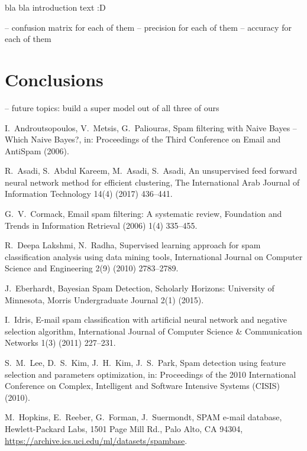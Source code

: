 \documentclass[11pt,a4paper]{article}
\begin{document}
bla bla introduction text :D


-- confusion matrix for each of them
-- precision for each of them
-- accuracy for each of them

\section{Conclusions}

-- future topics: build a super model out of all three of ours


\begin{thebibliography}{99}
\begin{small}
  I.\ Androutsopoulos, V.\ Metsis, G.\ Paliouras,
  Spam filtering with Naive Bayes -- Which Naive Bayes?,
  in: Proceedings of the Third Conference on Email and AntiSpam (2006).

  R.\ Asadi, S.\ Abdul Kareem, M.\ Asadi, S.\ Asadi, 
  An unsupervised feed forward neural network method for efficient clustering,
  The International Arab Journal of Information Technology 14(4) (2017) 436--441.

  G.\ V.\ Cormack, 
  Email spam filtering: A systematic review,
  Foundation and Trends in Information Retrieval (2006) 1(4) 335--455.

  R.\ Deepa Lakshmi, N.\ Radha, 
  Supervised learning approach for spam classification analysis using data mining tools,
  International Journal on Computer Science and Engineering 2(9) (2010) 2783--2789.

  J.\ Eberhardt, 
  Bayesian Spam Detection,
  Scholarly Horizons: University of Minnesota, Morris Undergraduate Journal  2(1) (2015).

  I.\ Idris, 
  E-mail spam classification with artificial neural network and negative selection algorithm,
  International Journal of Computer Science \& Communication Networks 1(3) (2011) 227--231.

  S.\ M.\ Lee, D.\ S.\ Kim, J.\ H.\ Kim, J.\ S.\ Park, 
  Spam detection using feature selection and parameters optimization,
  in: Proceedings of the 2010 International Conference on Complex, Intelligent and Software Intensive Systems (CISIS) (2010).

  M.\ Hopkins, E.\ Reeber, G.\ Forman, J.\ Suermondt, 
  SPAM e-mail database,
  Hewlett-Packard Labs, 1501 Page Mill Rd., Palo Alto, CA 94304,
  \url{https://archive.ics.uci.edu/ml/datasets/spambase}.


\end{small}
\end{thebibliography}
\end{document}
